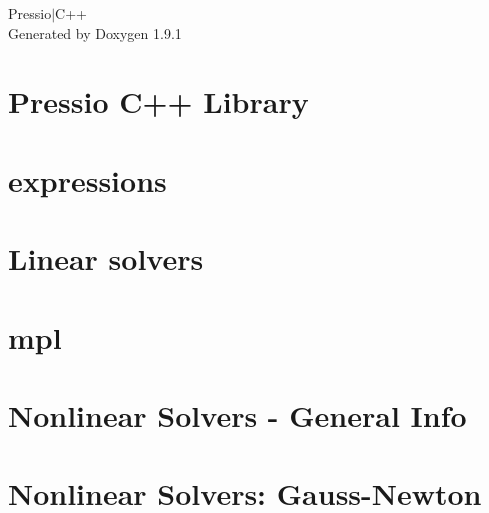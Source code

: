 \let\mypdfximage\pdfximage\def\pdfximage{\immediate\mypdfximage}\documentclass[twoside]{book}
\newcommand{\+}{\discretionary{\mbox{\scriptsize$\hookleftarrow$}}{}{}}
\newcommand{\clearemptydoublepage}{%
  \newpage{\pagestyle{empty}\cleardoublepage}%
}
\begin{document}
\raggedbottom

\hypersetup{pageanchor=false,
             bookmarksnumbered=true,
             pdfencoding=unicode
            }
\begin{titlepage}
\vspace*{7cm}
\begin{center}%
{\Large Pressio$\vert$\+C++ }\\
\vspace*{1cm}
{\large Generated by Doxygen 1.9.1}\\
\end{center}
\end{titlepage}
\clearemptydoublepage
{}
\tableofcontents
\clearemptydoublepage
{}
\hypersetup{pageanchor=true}

\chapter{Pressio C++ Library}
\label{index}\hypertarget{index}{}
\chapter{expressions}
\label{md_pages_components_expressions}

\chapter{Linear solvers}
\label{md_pages_components_linsolvers}

\chapter{mpl}
\label{md_pages_components_mpl}

\chapter{Nonlinear Solvers -\/ General Info}
\label{md_pages_components_nonlinsolvers_general}

\chapter{Nonlinear Solvers\+: Gauss-\/\+Newton}
\label{md_pages_components_nonlinsolvers_gn}

\end{document}
